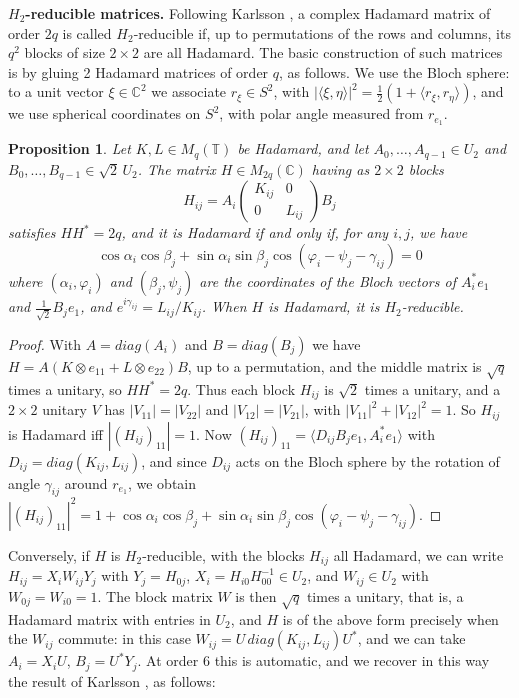 \documentclass[11pt]{amsart}
\newtheorem{proposition}[theorem]{Proposition}
\newcommand{\T}{\mathbb T}
\begin{document}
\medskip

\noindent\textbf{$H_2$-reducible matrices.} Following Karlsson \cite{ka2}, a complex Hadamard matrix of order $2q$ is called $H_2$-reducible if, up to permutations of the rows and columns, its $q^2$ blocks of size $2\times2$ are all Hadamard. The basic construction of such matrices is by gluing 2 Hadamard matrices of order $q$, as follows. We use the Bloch sphere: to a unit vector $\xi\in\mathbb C^2$ we associate $r_\xi\in S^2$, with $|\langle\xi,\eta\rangle|^2=\frac{1}{2}(1+\langle r_\xi,r_\eta\rangle)$, and we use spherical coordinates on $S^2$, with polar angle measured from $r_{e_1}$.

\begin{proposition}\label{prop:glue}
Let $K,L\in M_q(\T)$ be Hadamard, and let $A_0,\ldots,A_{q-1}\in U_2$ and $B_0,\ldots,B_{q-1}\in\sqrt2\,U_2$. The matrix $H\in M_{2q}(\mathbb C)$ having as $2\times2$ blocks
$$H_{ij}=A_i\begin{pmatrix}K_{ij}&0\\0&L_{ij}\end{pmatrix}B_j$$
satisfies $HH^*=2q$, and it is Hadamard if and only if, for any $i,j$, we have
$$\cos\alpha_i\cos\beta_j+\sin\alpha_i\sin\beta_j\cos(\varphi_i-\psi_j-\gamma_{ij})=0$$
where $(\alpha_i,\varphi_i)$ and $(\beta_j,\psi_j)$ are the coordinates of the Bloch vectors of $A_i^*e_1$ and $\frac{1}{\sqrt2}B_je_1$, and $e^{i\gamma_{ij}}=L_{ij}/K_{ij}$. When $H$ is Hadamard, it is $H_2$-reducible.
\end{proposition}

\begin{proof}
With $A=diag(A_i)$ and $B=diag(B_j)$ we have $H=A(K\otimes e_{11}+L\otimes e_{22})B$, up to a permutation, and the middle matrix is $\sqrt q$ times a unitary, so $HH^*=2q$. Thus each block $H_{ij}$ is $\sqrt2$ times a unitary, and a $2\times2$ unitary $V$ has $|V_{11}|=|V_{22}|$ and $|V_{12}|=|V_{21}|$, with $|V_{11}|^2+|V_{12}|^2=1$. So $H_{ij}$ is Hadamard iff $|(H_{ij})_{11}|=1$. Now $(H_{ij})_{11}=\langle D_{ij}B_je_1,A_i^*e_1\rangle$ with $D_{ij}=diag(K_{ij},L_{ij})$, and since $D_{ij}$ acts on the Bloch sphere by the rotation of angle $\gamma_{ij}$ around $r_{e_1}$, we obtain $|(H_{ij})_{11}|^2=1+\cos\alpha_i\cos\beta_j+\sin\alpha_i\sin\beta_j\cos(\varphi_i-\psi_j-\gamma_{ij})$.
\end{proof}

\noindent Conversely, if $H$ is $H_2$-reducible, with the blocks $H_{ij}$ all Hadamard, we can write $H_{ij}=X_iW_{ij}Y_j$ with $Y_j=H_{0j}$, $X_i=H_{i0}H_{00}^{-1}\in U_2$, and $W_{ij}\in U_2$ with $W_{0j}=W_{i0}=1$. The block matrix $W$ is then $\sqrt q$ times a unitary, that is, a Hadamard matrix with entries in $U_2$, and $H$ is of the above form precisely when the $W_{ij}$ commute: in this case $W_{ij}=U\,diag(K_{ij},L_{ij})U^*$, and we can take $A_i=X_iU$, $B_j=U^*Y_j$. At order 6 this is automatic, and we recover in this way the result of Karlsson \cite{ka2,kar}, as follows:
\end{document}
